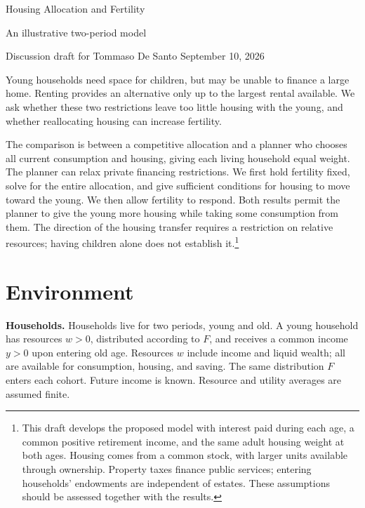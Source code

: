 \documentclass[11pt]{article}
\begin{document}
\begin{center}
{\Large Housing Allocation and Fertility}\par
\smallskip
{\large An illustrative two-period model}\par
\smallskip
{\small Discussion draft for Tommaso De Santo \quad September 10, 2026}
\end{center}
\medskip

Young households need space for children, but may be unable to finance a large
home. Renting provides an alternative only up to the largest rental available.
We ask whether these two restrictions leave too little housing with the young,
and whether reallocating housing can increase fertility.

The comparison is between a competitive allocation and a planner who chooses
all current consumption and housing, giving each living household equal
weight. The planner can relax private financing restrictions. We first hold
fertility fixed, solve for the entire allocation, and give sufficient
conditions for housing to move toward the young. We then allow fertility to
respond. Both results permit the planner to give the young more housing while
taking some consumption from them. The direction of the housing transfer
requires a restriction on relative resources; having children alone does not
establish it.\footnote{This draft develops the proposed model with interest
paid during each age, a common positive retirement income, and the same adult
housing weight at both ages. Housing comes from a common stock, with larger
units available through ownership. Property taxes finance public services;
entering households' endowments are independent of estates. These assumptions
should be assessed together with the results.}

\section{Environment}

\textbf{Households.} Households live for two periods, young and old. A young
household has resources $w>0$, distributed according to $F$, and receives a
common income $y>0$ upon entering old age. Resources $w$ include income and
liquid wealth; all are available for consumption, housing, and saving. The
same distribution $F$ enters each cohort. Future income is known. Resource
and utility averages are assumed finite.
\end{document}
